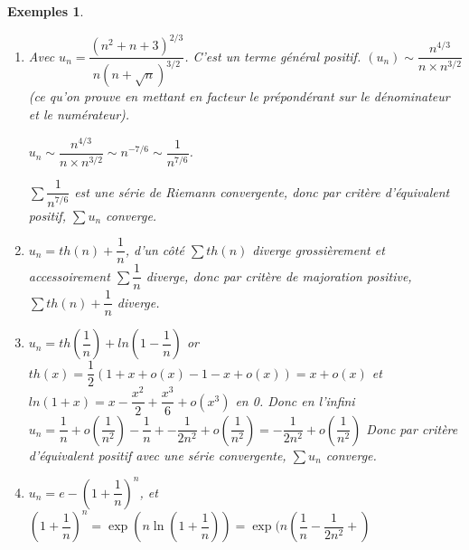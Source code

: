 \documentclass[a4paper,12pt]{book}
\newtheorem{Exes}{Exemples}[section]
\begin{document}
\begin{Exes}\begin{enumerate}
\item Avec $u_n =\dfrac{(n^2+n+3)^{2/3}}{n(n+\sqrt{n})^{3/2}}$. C'est un terme général positif. $(u_n) \sim \dfrac{n^{4/3}}{n\times n^{3/2}}$ (ce qu'on prouve en mettant en facteur le prépondérant sur le dénominateur et le numérateur).
\par $u_n\sim \dfrac{n^{4/3}}{n\times n^{3/2}}\sim n^{-7/6}\sim\dfrac{1}{n^{7/6}}$.
\par $\sum \dfrac{1}{n^{7/6}}$ est une série de Riemann convergente, donc par critère d'équivalent positif, $\sum u_n$ converge.
\item $u_n = th(n) + \dfrac{1}{n}$, d'un côté $\sum th(n)$ diverge grossièrement et accessoirement $\sum\dfrac{1}{n}$ diverge, donc par critère de majoration positive, $\sum th(n) +\dfrac{1}{n}$ diverge.
\item $u_n = th(\dfrac{1}{n}) + ln(1-\dfrac{1}{n})$ or $th(x) = \dfrac{1}{2}(1+x+o(x) - 1 - x + o(x)) = x + o(x)$ et $ln(1+x) = x -\dfrac{x^2}{2} + \dfrac{x^3}{6} + o(x^3)$ en 0. Donc en l'infini $u_n = \dfrac{1}{n} + o(\dfrac{1}{n^2}) - \dfrac{1}{n} + -\dfrac{1}{2n^2} + o(\dfrac{1}{n^2}) = -\dfrac{1}{2n^2} + o(\dfrac{1}{n^2})$ Donc par critère d'équivalent positif avec une série convergente, $\sum u_n$ converge.
\item $u_n = e - \left(1+\dfrac{1}{n}\right)^n$, et $\left(1+\dfrac{1}{n}\right)^n = \exp(n\ln(1+\dfrac{1}{n})) = \exp(n (\dfrac{1}{n} - \dfrac{1}{2n^2} +)$
\end{enumerate}\end{Exes}
\end{document}
